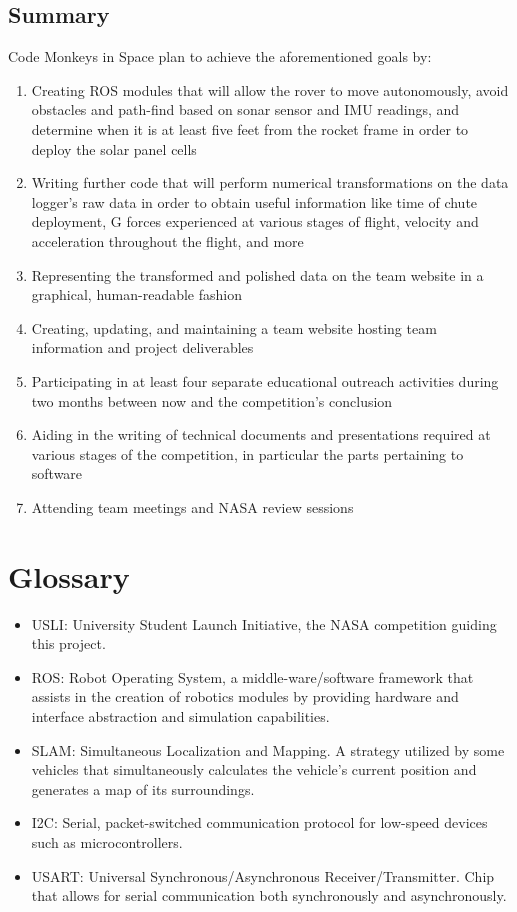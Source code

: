 \documentclass[onecolumn, draftclsnofoot,10pt, compsoc]{IEEEtran}
\begin{document}
\subsection{Summary}
Code Monkeys in Space plan to achieve the aforementioned goals by:
\begin{enumerate}
\item Creating ROS modules that will allow the rover to move autonomously, avoid obstacles and path-find based on sonar sensor and IMU readings, and determine when it is at least five feet from the rocket frame in order to deploy the solar panel cells
\item Writing further code that will perform numerical transformations on the data logger's raw data in order to obtain useful information like time of chute deployment, G forces experienced at various stages of flight, velocity and acceleration throughout the flight, and more
\item Representing the transformed and polished data on the team website in a graphical, human-readable fashion
\item Creating, updating, and maintaining a team website hosting team information and project deliverables
\item Participating in at least four separate educational outreach activities during two months between now and the competition's conclusion
\item Aiding in the writing of technical documents and presentations required at various stages of the competition, in particular the parts pertaining to software
\item Attending team meetings and NASA review sessions
\end{enumerate}
\nocite{*}%


\section{Glossary}

\begin{itemize}
	\item USLI: University Student Launch Initiative, the NASA competition guiding this project.
    \item ROS: Robot Operating System, a middle-ware/software framework that assists in the creation of robotics modules by providing hardware and interface abstraction and simulation capabilities.
    \item SLAM: Simultaneous Localization and Mapping. A strategy utilized by some vehicles that simultaneously calculates the vehicle's current position and generates a map of its surroundings.
    \item I2C: Serial, packet-switched communication protocol for low-speed devices such as microcontrollers.
    \item USART: Universal Synchronous/Asynchronous Receiver/Transmitter. Chip that allows for serial communication both synchronously and asynchronously.
\end{itemize}
\end{document}
